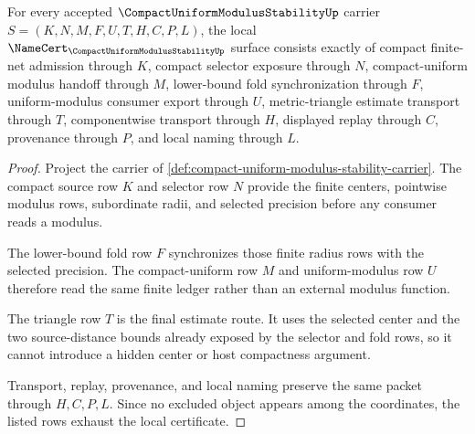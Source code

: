 \begin{theorem}
\label{thm:compact-uniform-modulus-stability-namecert-obligations}
For every accepted $\CompactUniformModulusStabilityUp$ carrier $S=(K,N,M,F,U,T,H,C,P,L)$, the local $\NameCert_{\CompactUniformModulusStabilityUp}$ surface consists exactly of compact finite-net admission through $K$, compact selector exposure through $N$, compact-uniform modulus handoff through $M$, lower-bound fold synchronization through $F$, uniform-modulus consumer export through $U$, metric-triangle estimate transport through $T$, componentwise transport through $H$, displayed replay through $C$, provenance through $P$, and local naming through $L$.
\end{theorem}
\begin{proof}
Project the carrier of \autoref{def:compact-uniform-modulus-stability-carrier}. The compact source row $K$ and selector row $N$ provide the finite centers, pointwise modulus rows, subordinate radii, and selected precision before any consumer reads a modulus.

The lower-bound fold row $F$ synchronizes those finite radius rows with the selected precision. The compact-uniform row $M$ and uniform-modulus row $U$ therefore read the same finite ledger rather than an external modulus function.

The triangle row $T$ is the final estimate route. It uses the selected center and the two source-distance bounds already exposed by the selector and fold rows, so it cannot introduce a hidden center or host compactness argument.

Transport, replay, provenance, and local naming preserve the same packet through $H,C,P,L$. Since no excluded object appears among the coordinates, the listed rows exhaust the local certificate.
\end{proof}

